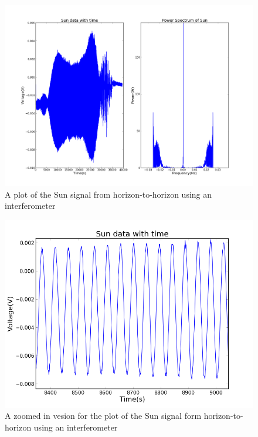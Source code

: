 \documentclass[12pt]{article}
\begin{document}
  
\begin {figure}[h!]
\centering
\includegraphics[scale = 0.5]
{sungraph1.png}
\caption{\label{rvd} A plot of the Sun signal from horizon-to-horizon
  using an interferometer}
\end {figure}

\begin {figure}[h!]
\centering
\includegraphics[scale = 0.5]
{zoomsun.png}
\caption{\label{rvd} A zoomed in vesion for the plot of the Sun signal
  form horizon-to-horizon using an interferometer}
\end {figure}
\end{document}

